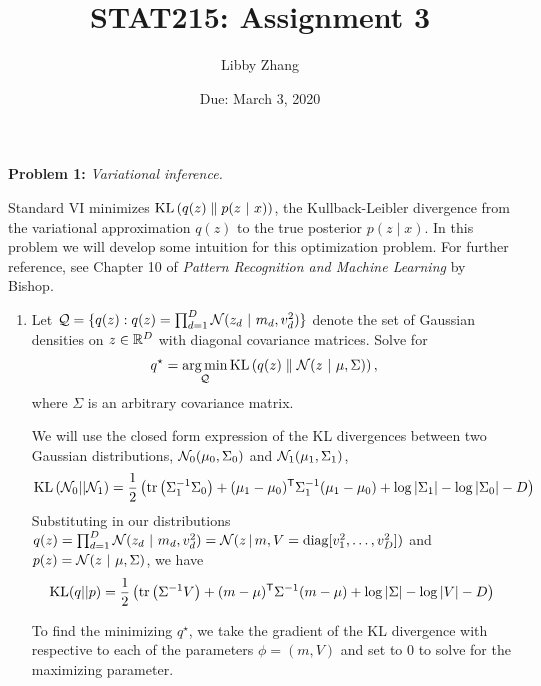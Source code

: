 \documentclass[11pt]{article}
\title{STAT215: Assignment 3}
\author{Libby Zhang}
\date{Due: March 3, 2020}
\newcommand{\inv}{{-1}}
\begin{document}
\maketitle

\textbf{Problem 1:} \textit{Variational inference.} 

Standard VI minimizes $\textrm{KL}\left(q(z)\;\|\;p(z ~\vert~ x)\right)$, the Kullback-Leibler divergence from the variational approximation $q(z)$ to the true posterior $p(z \mid x)$.  In this problem we will develop some intuition for this optimization problem.  For further reference, see Chapter 10 of \textit{Pattern Recognition and Machine Learning} by Bishop.

\begin{enumerate}[label=(\alph*)]
    \item Let $\mathcal{Q} = \{q(z): q(z) = \prod_{d=1}^D \mathcal{N}(z_d ~\vert~ m_d, v_d^2)\}$ denote the set of Gaussian densities on $z \in \mathbb{R}^D$ with diagonal covariance matrices.  Solve for 
    \begin{align*}
        q^\star &= \operatorname*{arg\,min}_{\mathcal{Q}} \textrm{KL}\left(q(z)\;\|\;\mathcal{N}(z ~\vert~ \mu, \Sigma)\right),
    \end{align*}
    where $\Sigma$ is an arbitrary covariance matrix.
    
    \begin{solution}
    We will use the closed form expression of the KL divergences between two Gaussian distributions, $\mathcal{N}_0(\mu_0, \Sigma_0)$ and $\mathcal{N}_1(\mu_1, \Sigma_1)$,
    \begin{equation}\label{eqn:KL_gaussians}
        \textrm{KL}\left(\cN_0 || \cN_1 \right)
        = \frac{1}{2}\left(
            \textrm{tr}\left(\Sigma_1^\inv \Sigma_0 \right)
            + (\mu_1 - \mu_0)^\trans \Sigma_1^\inv (\mu_1 - \mu_0)
            +\log |\Sigma_1| - \log |\Sigma_0| - D
            \right)
    \end{equation}
    Substituting in our distributions $q(z) = \prod_{d=1}^D \mathcal{N}(z_d ~\vert~ m_d, v_d^2) = \mathcal{N}(z \,|\, m, V = \textrm{diag}[v_1^2, \ldots, v_D^2])$ and $p(z) = \mathcal{N}(z ~\vert~ \mu, \Sigma)$, we have
    \begin{equation*}
        \textrm{KL}(q||p) = \frac{1}{2}\left(
            \textrm{tr} \left(\Sigma^\inv V \right)
            + (m - \mu)^\trans \Sigma^\inv (m - \mu)
            +\log |\Sigma| - \log |V| - D
        \right)
    \end{equation*}

    To find the minimizing $q^\star$, we take the gradient of the KL divergence with respective to each of the parameters $\phi = (m, V)$ and set to 0 to solve for the maximizing parameter.


\end{solution}
\end{enumerate}
\end{document}
